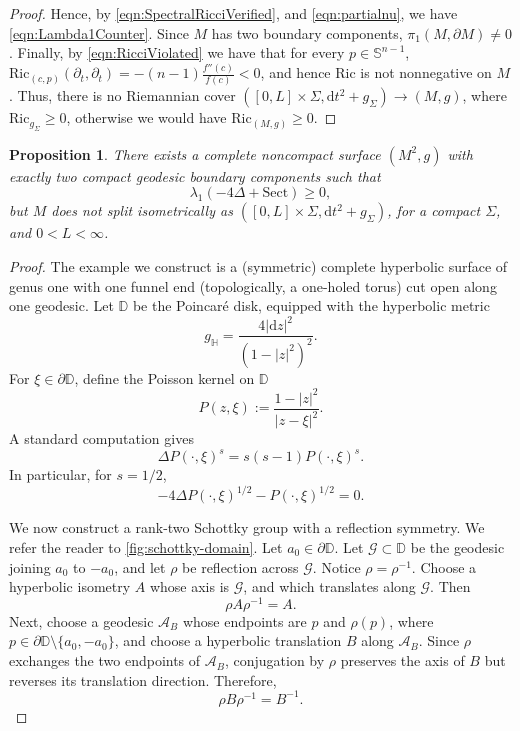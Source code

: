 \documentclass[12pt,a4paper,reqno]{amsart}
\newtheorem{proposition}{Proposition}
\theoremstyle{definition}
\renewcommand{\geq}{\geqslant}
\begin{document}
{\begin{proof}
Hence, by \eqref{eqn:SpectralRicciVerified}, and \eqref{eqn:partialnu}, we have \eqref{eqn:Lambda1Counter}. Since \(M\) has two boundary components, \(\pi_1(M,\partial M)\neq 0\).
Finally, by \eqref{eqn:RicciViolated} we have that for every $p\in\mathbb S^{n-1}$, $\mathrm{Ric}_{(c,p)}(\partial _t,\partial_t)=-(n-1)\frac{f''(c)}{f(c)}<0$, and hence $\mathrm{Ric}$ is not nonnegative on $M$. Thus, there is no Riemannian cover $([0,L]\times\Sigma,\mathrm{d}t^2+g_\Sigma)\to (M,g)$, where $\mathrm{Ric}_{g_\Sigma}\geq 0$, otherwise we would have $\mathrm{Ric}_{(M,g)}\geq 0$.
\end{proof}
\begin{proposition}\label{prop:HyperbolicCounterexample}
    There exists a complete noncompact surface $(M^2,g)$ with exactly two compact geodesic boundary components such that 
    \[
    \lambda_1(-4\Delta+\mathrm{Sect})\geq 0,
    \]
    but $M$ does not split isometrically as $([0,L]\times\Sigma,\mathrm{d}t^2+g_\Sigma)$, for a compact $\Sigma$, and $0<L<\infty$.
\end{proposition}
\begin{proof}
The example we construct is a (symmetric) complete hyperbolic surface of genus one with one funnel end (topologically, a one-holed torus) cut open along one geodesic. Let $\mathbb D$ be the Poincaré disk, equipped with the hyperbolic metric
\[
g_{\mathbb H}=\frac{4|\mathrm{d}z|^2}{(1-|z|^2)^2}.
\]
For $\xi\in \partial\mathbb D$, define the Poisson kernel on $\mathbb D$
\[
P(z,\xi):=\frac{1-|z|^2}{|z-\xi|^2}.
\]
A standard computation gives
\[
\Delta P(\cdot,\xi)^s
=
s(s-1)P(\cdot,\xi)^s.
\]
In particular, for $s=1/2$,
\begin{equation}\label{eqn:CompPoisson}
-4\Delta P(\cdot,\xi)^{1/2}
-
P(\cdot,\xi)^{1/2}
=0.
\end{equation}

We now construct a rank-two Schottky group with a reflection symmetry. We refer the reader to \cref{fig:schottky-domain}.
Let $a_0\in\partial \mathbb D$. Let
$\mathcal G\subset\mathbb D$ be the geodesic joining $a_0$ to $-a_0$, and let
$\rho$ be reflection across $\mathcal G$. Notice $\rho=\rho^{-1}$.
Choose a hyperbolic isometry $A$ whose axis is $\mathcal G$, and which translates along $\mathcal G$. Then
\[
\rho A\rho^{-1}=A.
\]
Next, choose a geodesic $\mathcal A_B$ whose endpoints are $p$ and
$\rho(p)$, where $p\in\partial\mathbb D\setminus\{a_0,-a_0\}$, and choose a
hyperbolic translation $B$ along $\mathcal A_B$. Since $\rho$ exchanges
the two endpoints of $\mathcal A_B$, conjugation by $\rho$ preserves the
axis of $B$ but reverses its translation direction. Therefore,
\[
\rho B\rho^{-1}=B^{-1}.
\]


\end{proof}}
\end{document}

